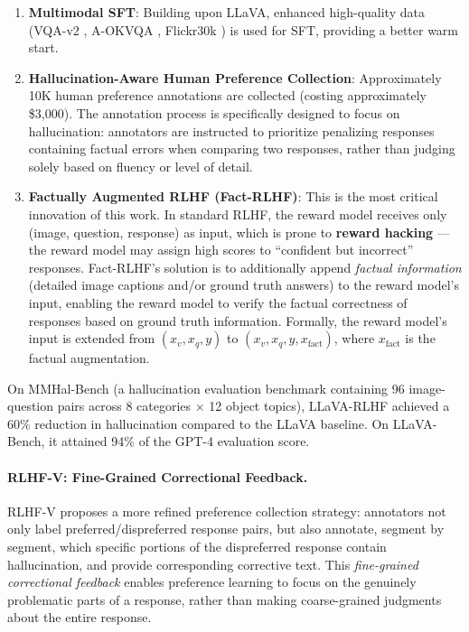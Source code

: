 \begin{enumerate}[leftmargin=2em]
  \item \textbf{Multimodal SFT}:
    Building upon LLaVA, enhanced high-quality data
    (VQA-v2 \cite{goyal2017vqav2}, A-OKVQA \cite{schwenk2022aokvqa}, Flickr30k \cite{plummer2015flickr30k})
    is used for SFT, providing a better warm start.

  \item \textbf{Hallucination-Aware Human Preference Collection}:
    Approximately 10K human preference annotations are collected (costing approximately \$3,000).
    The annotation process is specifically designed to focus on hallucination:
    annotators are instructed to prioritize penalizing responses containing factual errors
    when comparing two responses,
    rather than judging solely based on fluency or level of detail.

  \item \textbf{Factually Augmented RLHF (Fact-RLHF)}:
    This is the most critical innovation of this work.
    In standard RLHF, the reward model receives only (image, question, response) as input,
    which is prone to \textbf{reward hacking} ---
    the reward model may assign high scores to ``confident but incorrect'' responses.
    Fact-RLHF's solution is to additionally append \textit{factual information}
    (detailed image captions and/or ground truth answers) to the reward model's input,
    enabling the reward model to verify the factual correctness of responses based on ground truth information.
    Formally, the reward model's input is extended from $(x_v, x_q, y)$ to $(x_v, x_q, y, x_{\text{fact}})$,
    where $x_{\text{fact}}$ is the factual augmentation.
\end{enumerate}

\noindent
On MMHal-Bench (a hallucination evaluation benchmark containing 96 image-question pairs
across 8 categories $\times$ 12 object topics),
LLaVA-RLHF achieved a 60\% reduction in hallucination compared to the LLaVA baseline.
On LLaVA-Bench, it attained 94\% of the GPT-4 evaluation score.

\paragraph{RLHF-V: Fine-Grained Correctional Feedback.}
RLHF-V \cite{yu2023rlhfv} proposes a more refined preference collection strategy:
annotators not only label preferred/dispreferred response pairs,
but also annotate, segment by segment, which specific portions of the dispreferred response contain hallucination,
and provide corresponding corrective text.
This \textit{fine-grained correctional feedback} enables preference learning
to focus on the genuinely problematic parts of a response, rather than making coarse-grained judgments about the entire response.

